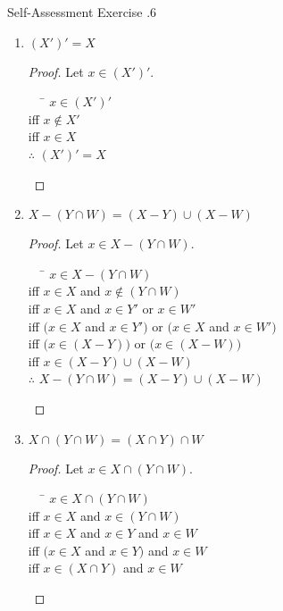 \documentclass[\main/notes.tex]{subfiles}
\begin{document}
			\begin{exercise}{Self-Assessment Exercise \thechapter.6}
				\begin{multicols}{2}
					\begin{enumerate}[label=(\alph*), itemsep=0.5em]
						\item $(X')' = X$
							\begin{proof}
								Let $x \in (X')'$.
								\begin{tabbing}
									$\quad$ \= $x \in (X')'$\\
									iff \> $x \notin X'$\\
									iff \> $x \in X$\\
									$\therefore$ \> $(X')' = X$
								\end{tabbing}
							\end{proof}
						\item $X - (Y \cap W) = (X - Y) \cup (X - W)$
							\begin{proof}
								Let $x \in X - (Y \cap W)$.
								\begin{tabbing}
									$\quad$ \= $x \in X - (Y \cap W)$\\
									iff \> $x \in X$ and $x \notin (Y \cap W)$\\
									iff \> $x \in X$ and $x \in Y'$ or $x \in W'$\\
									iff \> $\bigl(x \in X$ and $x \in Y'\bigr)$ or $\bigl(x \in X$ and $x \in W'\bigr)$\\
									iff \> $\bigl(x \in (X - Y)\bigr)$ or $\bigl(x \in (X - W)\bigr)$\\
									iff \> $x \in (X - Y) \cup (X - W)$\\
									$\therefore$ \> $X - (Y \cap W) = (X - Y) \cup (X - W)$
								\end{tabbing}
							\end{proof}
						\columnbreak
						\item $X \cap (Y \cap W) = (X \cap Y) \cap W$
							\begin{proof}
								Let $x \in X \cap (Y \cap W)$.
								\begin{tabbing}
									$\quad$ \= $x \in X \cap (Y \cap W)$\\
									iff \> $x \in X$ and $x \in (Y \cap W)$\\
									iff \> $x \in X$ and $x \in Y$ and $x \in W$\\
									iff \> $(x \in X$ and $x \in Y)$ and $x \in W$\\
									iff \> $x \in (X \cap Y)$ and $x \in W$\\

\end{tabbing}
\end{proof}
\end{enumerate}
\end{multicols}
\end{exercise}
\end{document}
